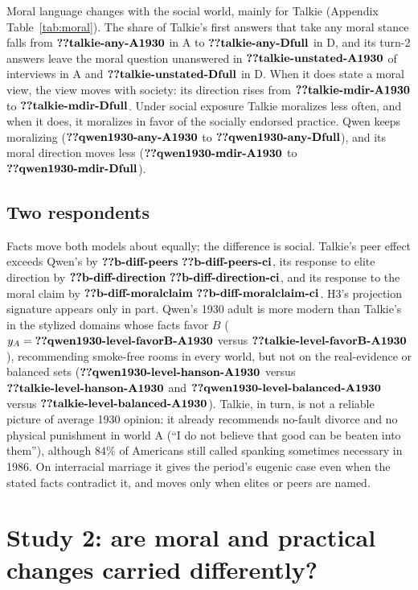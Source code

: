 \documentclass[11pt]{article}
\makeatletter
\newcommand{\nv}[1]{\ifcsname n@#1\endcsname\csname n@#1\endcsname\else\textbf{??#1}\fi}
\newcommand{\nvc}[1]{\ensuremath{\nv{#1}\ \nv{#1-ci}}}
\makeatother
\begin{document}
Moral language changes with the social world, mainly for Talkie (Appendix Table~\ref{tab:moral}).
The share of Talkie's first answers that take any moral stance falls from $\nv{talkie-any-A1930}$ in A to $\nv{talkie-any-Dfull}$ in D, and its turn-2 answers leave the moral question unanswered in $\nv{talkie-unstated-A1930}$ of interviews in A and $\nv{talkie-unstated-Dfull}$ in D.
When it does state a moral view, the view moves with society: its direction rises from $\nv{talkie-mdir-A1930}$ to $\nv{talkie-mdir-Dfull}$.
Under social exposure Talkie moralizes less often, and when it does, it moralizes in favor of the socially endorsed practice.
Qwen keeps moralizing ($\nv{qwen1930-any-A1930}$ to $\nv{qwen1930-any-Dfull}$), and its moral direction moves less ($\nv{qwen1930-mdir-A1930}$ to $\nv{qwen1930-mdir-Dfull}$).

\subsection{Two respondents}

Facts move both models about equally; the difference is social.
Talkie's peer effect exceeds Qwen's by $\nvc{b-diff-peers}$, its response to elite direction by $\nvc{b-diff-direction}$, and its response to the moral claim by $\nvc{b-diff-moralclaim}$.
H3's projection signature appears only in part.
Qwen's 1930 adult is more modern than Talkie's in the stylized domains whose facts favor $B$ ($y_A=\nv{qwen1930-level-favorB-A1930}$ versus $\nv{talkie-level-favorB-A1930}$), recommending smoke-free rooms in every world, but not on the real-evidence or balanced sets ($\nv{qwen1930-level-hanson-A1930}$ versus $\nv{talkie-level-hanson-A1930}$ and $\nv{qwen1930-level-balanced-A1930}$ versus $\nv{talkie-level-balanced-A1930}$).
Talkie, in turn, is not a reliable picture of average 1930 opinion: it already recommends no-fault divorce and no physical punishment in world A (``I do not believe that good can be beaten into them''), although $84\%$ of Americans still called spanking sometimes necessary in 1986.
On interracial marriage it gives the period's eugenic case even when the stated facts contradict it, and moves only when elites or peers are named.

\section{Study 2: are moral and practical changes carried differently?}
\label{sec:study2}
\end{document}
